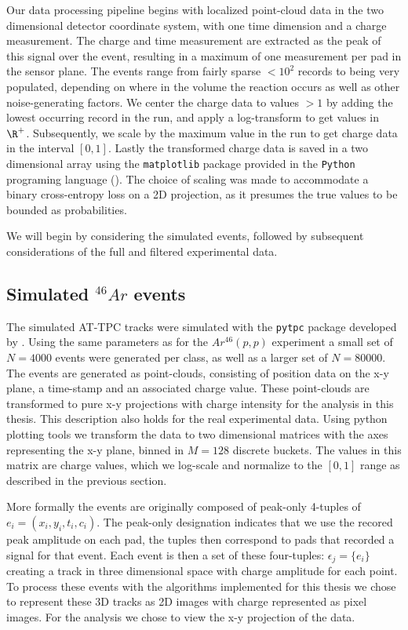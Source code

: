 Our data processing pipeline begins with localized point-cloud data in the two dimensional detector coordinate system, with one time dimension and a charge measurement. The charge and time measurement are extracted as the peak of this signal over the event, resulting in a maximum of one measurement per pad in the sensor plane. The events range from fairly sparse $< 10^2$ records to being very populated, depending on where in the volume the reaction occurs as well as other noise-generating factors. We center the charge data to values $>1$ by adding the lowest occurring record in the run, and apply a log-transform to get values in $\R^+$. Subsequently, we scale by the maximum value in the run to get charge data in the interval $[0, 1]$. Lastly the transformed charge data is saved in a two dimensional array using the \lstinline{matplotlib} package provided in the \lstinline{Python} programing language (\cite{matplotlib}). The choice of scaling was made to accommodate a binary cross-entropy loss on a 2D projection, as it presumes the true values to be bounded as probabilities.

We will begin by considering the simulated events, followed by subsequent considerations of the full and filtered experimental data.

\subsection{Simulated \texorpdfstring{${}^{46}Ar$}{46Ar}  events}\label{sec:data_sim}

The simulated AT-TPC tracks were simulated with the \lstinline{pytpc} package developed by \citet{Bradt2017a}. Using the same parameters as for the $Ar^{46}(p, p)$ experiment a small set of $N=4000$ events were generated per class, as well as a larger set of $N=80000$. The events are generated as point-clouds, consisting of position data on the x-y plane, a time-stamp and an associated charge value. These point-clouds are transformed to pure x-y projections with charge intensity for the analysis in this thesis. This description also holds for the real experimental data. Using python plotting tools we transform the data to two dimensional matrices with the axes representing the x-y plane, binned in $M=128$ discrete buckets. The values in this matrix are charge values, which we log-scale and normalize to the $[0, 1]$ range as described in the previous section. 

More formally the events are originally composed of peak-only 4-tuples of $e_i = (x_i, y_i, t_i, c_i)$. The peak-only designation indicates that we use the recored peak amplitude on each pad, the tuples then correspond to pads that recorded a signal for that event. Each event is then a set of these four-tuples: $\epsilon_j = \{e_i\}$ creating a track in three dimensional space with charge amplitude for each point. To process these events with the algorithms implemented for this thesis we chose to represent these 3D tracks as 2D images with charge represented as pixel images. For the analysis we chose to view the x-y projection of the data.


